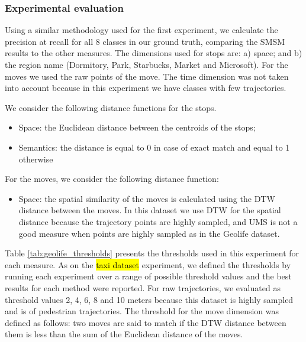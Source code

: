 \documentclass[12pt]{article}
\begin{document}
\subsubsection{Experimental evaluation}

Using a similar methodology used for the first experiment, we calculate the precision at recall for all 8 classes in our ground truth, comparing the SMSM results to the other measures. The dimensions used for stops are: a) space; and b) the region name (Dormitory, Park, Starbucks, Market and Microsoft). For the moves we used the raw points of the move. The time dimension was not taken into account because in this experiment we have classes with few trajectories.

We consider the following distance functions for the stops.
\begin{itemize}
  \item Space: the Euclidean distance between the centroids of the stops;
  \item Semantics: the distance is equal to 0 in case of exact match and equal to 1 otherwise
\end{itemize}

For the moves, we consider the following distance function:
\begin{itemize}
  \item Space: the spatial similarity of the moves is calculated using the DTW distance between the moves. In this dataset we use DTW for the spatial distance because the trajectory points are highly sampled, and UMS is not a good measure when points are highly sampled as in the Geolife dataset.
\end{itemize}

Table \ref{tab:geolife_thresholds} presents the thresholds used in this experiment for each measure. As on the \hl{taxi dataset} experiment, we defined the thresholds by running each experiment over a range of possible threshold values and the best results for each method were reported. For raw trajectories, we evaluated as threshold values 2, 4, 6, 8 and 10 meters because this dataset is highly sampled and is of pedestrian trajectories. The threshold for the move dimension was defined as follows: two moves are said to match if the DTW distance between them is less than the sum of the Euclidean distance of the moves.
\end{document}
